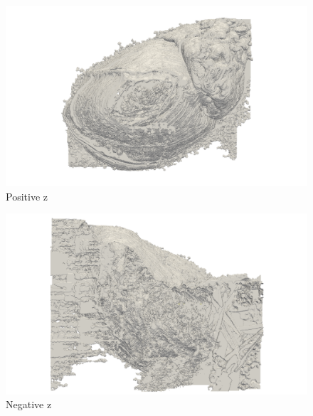     \begin{figure}
      \centering
      \includegraphics[width=\textheight]{Ch6/Figs/Rat28/contours/LoRes_positive_z}
      \caption{Positive z}
      \label{fig:LoRes_positive_z}
    \end{figure}
    
    \begin{figure}
      \centering
      \includegraphics[width=\textheight]{Ch6/Figs/Rat28/contours/LoRes_negative_z}
      \caption{Negative z}
      \label{fig:LoRes_negative_z}
    \end{figure}
    
